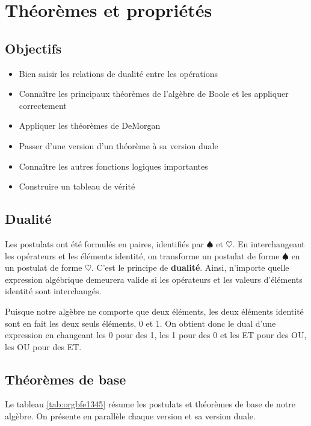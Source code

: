 \documentclass[11pt]{article}
\begin{document}
\section{Théorèmes et propriétés}
\label{sec:orgda7d32e}
\subsection{Objectifs}
\label{sec:orgc5290e2}
\begin{itemize}
\item Bien saisir les relations de dualité entre les opérations
\item Connaître les principaux théorèmes de l'algèbre de Boole et
les appliquer correctement
\item Appliquer les théorèmes de DeMorgan
\item Passer d'une version d'un théorème à sa version duale
\item Connaître les autres fonctions logiques importantes
\item Construire un tableau de vérité
\end{itemize}

\subsection{Dualité}
\label{sec:org2b1d7f9}

Les postulats ont été formulés en paires, identifiés par \(\spadesuit\) et
\(\heartsuit\). En interchangeant les opérateurs et les éléments identité, on
transforme un postulat de forme \(\spadesuit\) en un postulat de forme
\(\heartsuit\). C'est le principe de \textbf{dualité}. Ainsi, n'importe quelle
expression algébrique demeurera valide si les opérateurs et les
valeurs d'éléments identité sont interchangés.

Puisque notre algèbre ne comporte que deux éléments, les deux éléments
identité sont en fait les deux seuls éléments, 0 et 1. On obtient donc
le dual d'une expression en changeant les 0 pour des 1, les 1 pour des
0 et les ET pour des OU, les OU pour des ET.

\subsection{Théorèmes de base}
\label{sec:orgbcaab63}

Le tableau \ref{tab:orgbfe1345} résume les postulats et théorèmes de base de
notre algèbre. On présente en parallèle chaque version et sa version
duale.
\end{document}
